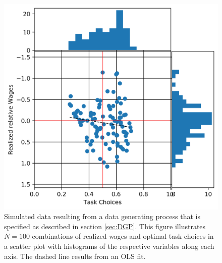 \documentclass[../main.tex]{subfiles}
\begin{document}
\begin{figure}[!htbp]
	\centering
	\includegraphics[scale=0.7]{./FIG/simulated_data.png} 
	\caption{Simulated data resulting from a data generating process that is specified as described in section \ref{sec:DGP}. This figure illustrates $N=100$ combinations of realized wages and optimal task choices in a scatter plot with histograms of the respective variables along each axis. The dashed line results from an OLS fit.}
	\label{fig:simulated_data}
\end{figure}

\FloatBarrier
\end{document}
